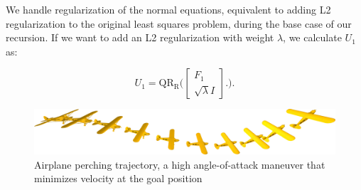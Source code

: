 \documentclass{article}
\begin{document}
We handle regularization of the normal equations, equivalent to adding L2 regularization to 
the original least squares problem, during the base case of our recursion. If we want to 
add an L2 regularization with weight $\lambda$, we calculate $U_1$ as:

\begin{equation}
  U_1 =  \operatorname{QR_R}\bigg( 
  \begin{bmatrix} {F_1} \\ \sqrt{\lambda} I \end{bmatrix}.
  \bigg).
\end{equation}

\begin{figure}
  \centering
  \includegraphics[width=\textwidth]{perch_cropped.png}
  \caption{Airplane perching trajectory, a high angle-of-attack maneuver that minimizes 
    velocity at the goal position}
  \label{fig:perch}
\end{figure}
\end{document}
